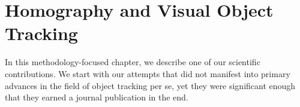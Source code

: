 \chapter{Homography and Visual Object Tracking}
\label{chap:HomographyAndVOT}

In this methodology-focused chapter, we describe one of our scientific contributions. We start with our attempts that did not manifest into primary advances in the field of object tracking per se, yet they were significant enough that they earned a journal publication in the end.






